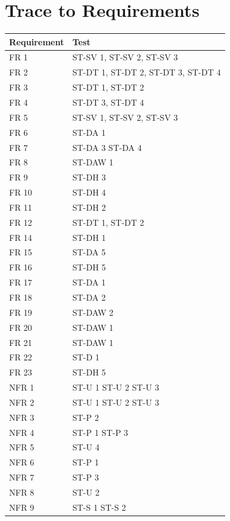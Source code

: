 \documentclass[12pt, titlepage]{article}
\begin{document}
\section{Trace to Requirements}
\begin{tabular}{| p{} | p{}|}
  \hline
  \rowcolor[gray]{0.9}
  Requirement & Test \\
  \hline
  FR 1 & ST-SV 1, ST-SV 2, ST-SV 3 \\
  \hline
  FR 2 & ST-DT 1, ST-DT 2, ST-DT 3, ST-DT 4 \\
  \hline
  FR 3 & ST-DT 1, ST-DT 2 \\
  \hline
  FR 4 & ST-DT 3, ST-DT 4 \\
  \hline
  FR 5 & ST-SV 1, ST-SV 2, ST-SV 3 \\
  \hline
  FR 6 & ST-DA 1 \\
  \hline
  FR 7 & ST-DA 3 ST-DA 4 \\
  \hline
  FR 8 & ST-DAW 1 \\
  \hline
  FR 9 & ST-DH 3 \\
  \hline
  FR 10 & ST-DH 4 \\
  \hline
  FR 11 & ST-DH 2 \\
  \hline
  FR 12 & ST-DT 1, ST-DT 2 \\
  \hline
  FR 14 & ST-DH 1 \\
  \hline
  FR 15 & ST-DA 5\\
  \hline
  FR 16 & ST-DH 5 \\
  \hline
  FR 17 & ST-DA 1 \\
  \hline
  FR 18 & ST-DA 2 \\
  \hline
  FR 19 & ST-DAW 2 \\
  \hline
  FR 20 & ST-DAW 1 \\
  \hline
  FR 21 & ST-DAW 1 \\
  \hline
  FR 22 & ST-D 1 \\
  \hline
  FR 23 & ST-DH 5 \\
  \hline
  NFR 1 & ST-U 1 ST-U 2 ST-U 3 \\
  \hline
  NFR 2 & ST-U 1 ST-U 2 ST-U 3 \\
  \hline
  NFR 3 & ST-P 2 \\
  \hline
  NFR 4 & ST-P 1 ST-P 3 \\
  \hline
  NFR 5 & ST-U 4 \\
  \hline
  NFR 6 & ST-P 1 \\
  \hline
  NFR 7 & ST-P 3 \\
  \hline
  NFR 8 & ST-U 2 \\
  \hline
  NFR 9 & ST-S 1 ST-S 2 \\
  \hline
\end{tabular}
		
\end{document}
